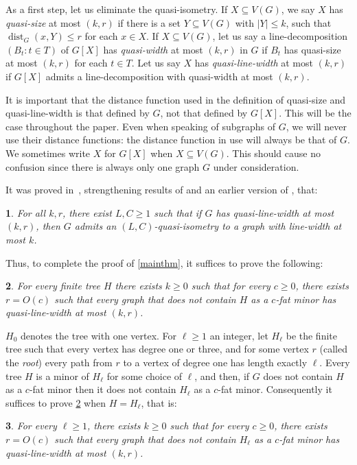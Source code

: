 \documentclass[titlepage,11pt]{article}
\newcommand{\dist}{\operatorname{dist}}
\newtheorem{thm}{}[section]
\begin{document}
	As a first step, let us eliminate the quasi-isometry. If $X\subseteq V(G)$, we say $X$ has {\em quasi-size} at most $(k,r)$
	if there is a set $Y\subseteq V(G)$ with $|Y|\le k$, such that $\dist_G(x,Y)\le r$ for each $x\in X$. 
	If $X\subseteq V(G)$, let us say a line-decomposition $(B_t:t\in T)$ of $G[X]$ has {\em quasi-width} at most $(k,r)$ in $G$ if 
	$B_t$ has quasi-size at most $(k,r)$ for each $t\in T$. Let us say $X$ has {\em quasi-line-width} at most $(k,r)$
	if $G[X]$ admits a line-decomposition with quasi-width at most $(k,r)$. 
	
	
	It is important that the distance function used in the definition of 
	quasi-size and quasi-line-width is that defined by $G$, not that defined by $G[X]$. This will be the case throughout the paper. 
	Even when speaking of subgraphs of $G$, we will never use their distance functions: the distance function in use will always be that of $G$.
	We sometimes write $X$ for $G[X]$ when $X\subseteq V(G)$. This should cause no confusion since there is always only one graph $G$ under consideration.
	
	
	It was proved in~\cite{coarsepw}, strengthening results of \cite{hick} and an earlier version of \cite{coarsetw}, that:
	\begin{thm}\label{quasitw}
		For all $k,r$, there exist $L,C\ge 1$ such that if $G$ has quasi-line-width at most $(k,r)$,
		then
		$G$ admits an $(L,C)$-quasi-isometry to a graph with line-width at most $k$.
	\end{thm}
	Thus, to complete the proof of \ref{mainthm}, it suffices to prove the following:
	\begin{thm}\label{mainthm2}
		For every finite tree $H$ there exists $k\ge 0$ such that for every $c\ge 0$, there exists $r= O(c)$ such that every graph
		that does not contain $H$ as a $c$-fat minor has quasi-line-width at most $(k,r)$.
	\end{thm}
	
	$H_0$ denotes the tree with one vertex. 
	For $\ell\ge 1$ an integer, let $H_\ell$ be the finite tree such that every vertex has degree one or three, and for some vertex $r$ (called the {\em root})
	every path from $r$ to a vertex of degree one has length exactly $\ell$. Every tree $H$ is a minor of $H_\ell$  for some choice of
	$\ell$, and then, if $G$ does not contain $H$ as a $c$-fat minor then it does not contain $H_\ell$ as a $c$-fat minor. Consequently
	it suffices to prove \ref{mainthm2} when $H=H_\ell$, that is:
	\begin{thm}\label{mainthm3}
		For every $\ell\ge 1$, there exists $k\ge 0$ such that for every $c\ge 0$, there exists $r=O(c)$ such that every graph
		that does not contain $H_\ell$ as a $c$-fat minor has quasi-line-width at most $(k,r)$.
	\end{thm}
\end{document}

